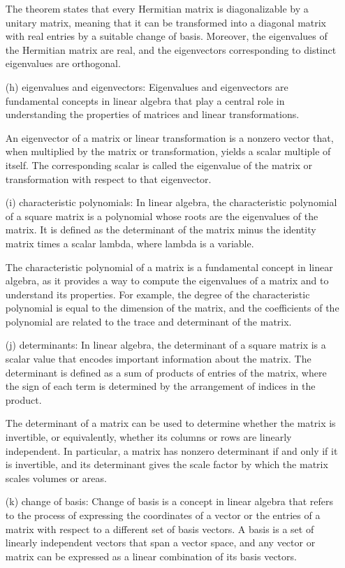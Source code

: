 \documentclass[fontsize=12pt]{scrartcl}
\begin{document}
\begin{itemize}
The theorem states that every Hermitian matrix is diagonalizable by a unitary matrix, meaning that it can be transformed into a diagonal matrix with real entries by a suitable change of basis. Moreover, the eigenvalues of the Hermitian matrix are real, and the eigenvectors corresponding to distinct eigenvalues are orthogonal.
    \item[(h)] eigenvalues and eigenvectors: Eigenvalues and eigenvectors are fundamental concepts in linear algebra that play a central role in understanding the properties of matrices and linear transformations.

An eigenvector of a matrix or linear transformation is a nonzero vector that, when multiplied by the matrix or transformation, yields a scalar multiple of itself. The corresponding scalar is called the eigenvalue of the matrix or transformation with respect to that eigenvector.
    \item[(i)] characteristic polynomials: In linear algebra, the characteristic polynomial of a square matrix is a polynomial whose roots are the eigenvalues of the matrix. It is defined as the determinant of the matrix minus the identity matrix times a scalar lambda, where lambda is a variable.

The characteristic polynomial of a matrix is a fundamental concept in linear algebra, as it provides a way to compute the eigenvalues of a matrix and to understand its properties. For example, the degree of the characteristic polynomial is equal to the dimension of the matrix, and the coefficients of the polynomial are related to the trace and determinant of the matrix.
    \item[(j)] determinants: In linear algebra, the determinant of a square matrix is a scalar value that encodes important information about the matrix. The determinant is defined as a sum of products of entries of the matrix, where the sign of each term is determined by the arrangement of indices in the product.

The determinant of a matrix can be used to determine whether the matrix is invertible, or equivalently, whether its columns or rows are linearly independent. In particular, a matrix has nonzero determinant if and only if it is invertible, and its determinant gives the scale factor by which the matrix scales volumes or areas.
    \item[(k)] change of basis: Change of basis is a concept in linear algebra that refers to the process of expressing the coordinates of a vector or the entries of a matrix with respect to a different set of basis vectors. A basis is a set of linearly independent vectors that span a vector space, and any vector or matrix can be expressed as a linear combination of its basis vectors.


\end{itemize}
\end{document}
